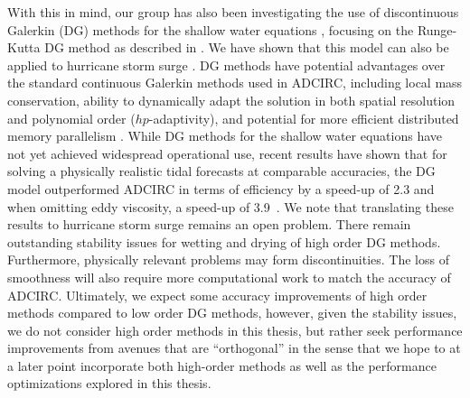 With this in mind, our group has also been investigating the use of discontinuous Galerkin (DG) methods for the shallow water equations \cite{Kubatko2006,Kubatko2009a,Kubatko2007,Bunya2009,Wirasaet2014,Wirasaet2015,Michoski2017,Michoski2015,Michoski2013,Michoski2011}, focusing on the Runge-Kutta DG method as described in \cite{Cockburn1989a}.  We have shown that this model can also be applied to  hurricane storm surge \cite{Dawson2011}.  DG methods have potential advantages over the standard continuous Galerkin methods used in ADCIRC, including local mass conservation, ability to dynamically adapt the solution in both spatial resolution and polynomial order ($hp$-adaptivity), and potential for more efficient distributed memory parallelism \cite{Kubatko2009b}.  While DG methods for the shallow water equations have not yet achieved widespread operational use, recent results have shown that for solving a physically realistic tidal forecasts at comparable accuracies, the DG model outperformed ADCIRC in terms of efficiency by a speed-up of 2.3 and when omitting eddy viscosity, a speed-up of 3.9~\cite{Brus2017}. We note that translating these results to hurricane storm surge remains an open problem. There remain outstanding stability issues for wetting and drying of high order DG methods. Furthermore, physically relevant problems may form discontinuities. The loss of smoothness will also require more computational work to match the accuracy of ADCIRC. 
Ultimately, we expect some accuracy improvements of high order methods compared to low order DG methods, however, given the stability issues, we do not consider high order methods in this thesis, but rather seek performance improvements from avenues that are ``orthogonal'' in the sense that we hope to at a later point incorporate both high-order methods as well as the performance optimizations explored in this thesis.

